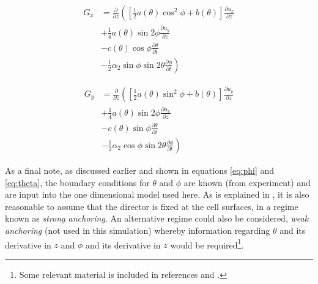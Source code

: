 \begin{align}
G_x &= \frac{\partial}{\partial z}\left(\left[\frac{1}{2}a\left(\theta\right)\cos^2\phi+b\left(\theta\right)\right]\frac{\partial u_x}{\partial z} \right. \nonumber \\
&+\frac{1}{4}a\left(\theta\right)\sin2\phi\frac{\partial u_y}{\partial z} \nonumber \\
&-c\left(\theta\right)\cos\phi\frac{\partial \theta}{\partial t} \nonumber \\
&\left.-\frac{1}{2}\alpha_2\sin\phi\sin2\theta\frac{\partial \phi}{\partial t}\right)
\label{eq:Gx}
\end{align}

\begin{align}
G_y &= \frac{\partial}{\partial z}\left(\left[\frac{1}{2}a\left(\theta\right)\sin^2\phi+b\left(\theta\right)\right]\frac{\partial u_y}{\partial z} \right. \nonumber \\
&+\frac{1}{4}a\left(\theta\right)\sin2\phi\frac{\partial u_x}{\partial z} \nonumber \\
&-c\left(\theta\right)\sin\phi\frac{\partial \theta}{\partial t} \nonumber \\
&\left.-\frac{1}{2}\alpha_2\cos\phi\sin2\theta\frac{\partial \phi}{\partial t}\right)
\label{eq:Gy}
\end{align}

% 
% 
% 

\noindent As a final note, as discussed earlier and shown in equations \ref{eq:phi} and \ref{eq:theta}, the boundary conditions for $\theta$ and $\phi$ are known (from experiment) and are input into the one dimensional model used here. As is explained in \cite{Cornford2008}, it is also reasonable to assume that the director is fixed at the cell surfaces, in a regime known as \textit{strong anchoring}. An alternative regime could also be considered, \textit{weak anchoring} (not used in this simulation) whereby information regarding $\theta$ and its derivative in $z$ and $\phi$ and its derivative in $z$ would be required\footnote{Some relevant material is included in references \cite{Cui2006} and \cite{Choate2008}.}.

